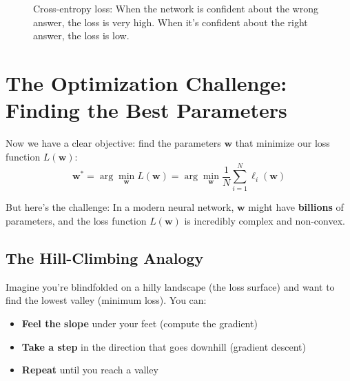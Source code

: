 \documentclass[11pt]{article}
\newcommand{\w}{\mathbf{w}}
\newcommand{\x}{\mathbf{x}}
\begin{document}
\begin{figure}[h!]
\centering
{}
\caption{Cross-entropy loss: When the network is confident about the wrong answer, the loss is very high. When it's confident about the right answer, the loss is low.}
\label{fig:cross_entropy}
\end{figure}

\section{The Optimization Challenge: Finding the Best Parameters}

Now we have a clear objective: find the parameters $\w$ that minimize our loss function $L(\w)$:
\begin{equation}
\boxed{\w^* = \arg\min_{\w} L(\w) = \arg\min_{\w} \frac{1}{N} \sum_{i=1}^{N} \ell_i(\w)}
\end{equation}

But here's the challenge: In a modern neural network, $\w$ might have \textbf{billions} of parameters, and the loss function $L(\w)$ is incredibly complex and non-convex.

\subsection{The Hill-Climbing Analogy}
Imagine you're blindfolded on a hilly landscape (the loss surface) and want to find the lowest valley (minimum loss). You can:
\begin{itemize}
\item \textbf{Feel the slope} under your feet (compute the gradient)
\item \textbf{Take a step} in the direction that goes downhill (gradient descent)
\item \textbf{Repeat} until you reach a valley
\end{itemize}
\end{document}
